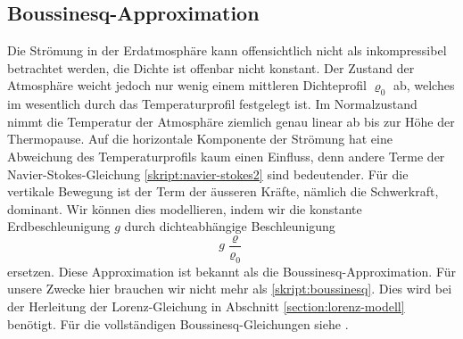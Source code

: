 \subsection{Boussinesq-Approximation}
Die Strömung in der Erdatmosphäre kann offensichtlich nicht als
inkompressibel betrachtet werden, die Dichte ist offenbar nicht
konstant.
Der Zustand der Atmosphäre weicht jedoch nur wenig einem mittleren
Dichteprofil $\varrho_0$ ab, welches im wesentlich durch das Temperaturprofil
festgelegt ist.
Im Normalzustand nimmt die Temperatur der Atmosphäre ziemlich genau
linear ab bis zur Höhe der Thermopause.
Auf die horizontale Komponente der Strömung hat eine Abweichung des
Temperaturprofils kaum einen Einfluss, denn andere Terme der
Navier-Stokes-Gleichung
\eqref{skript:navier-stokes2}
sind bedeutender.
Für die vertikale Bewegung ist der Term der äusseren Kräfte,
nämlich die Schwerkraft, dominant.
Wir können dies modellieren, indem wir die konstante Erdbeschleunigung
$g$ durch dichteabhängige Beschleunigung
\begin{equation}
g\frac{\varrho}{\varrho_0}
\label{skript:boussinesq}
\end{equation}
ersetzen.
Diese Approximation ist bekannt als die Boussinesq-Approximation.
Für unsere Zwecke hier brauchen wir nicht mehr als \eqref{skript:boussinesq}.
Dies wird bei der Herleitung der Lorenz-Gleichung in Abschnitt
\ref{section:lorenz-modell} benötigt.
Für die vollständigen Boussinesq-Gleichungen siehe \cite{skript:kaperengler}.

